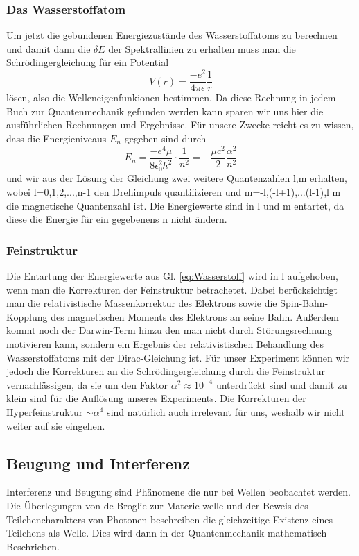 \documentclass[]{article}
\begin{document}
\subsubsection{Das Wasserstoffatom}
Um jetzt die gebundenen Energiezustände des Wasserstoffatoms zu berechnen und damit dann die $\delta E$ der Spektrallinien zu erhalten muss man die Schrödingergleichung für ein Potential
\begin{equation}
	V(r)=\frac{-e^2}{4\pi \epsilon} \frac{1}{r}
\end{equation}
lösen, also die Welleneigenfunkionen bestimmen. Da diese Rechnung in jedem Buch zur Quantenmechanik gefunden werden kann sparen wir uns hier die ausführlichen Rechnungen und Ergebnisse. Für unsere Zwecke reicht es zu wissen, dass die Energieniveaus $E_{n}$ gegeben sind durch
\begin{equation}
\label{eq:Wasserstoff}
	E_{n}=\frac{-e^4\mu}{8\epsilon_0^2h^2}\cdot \frac{1}{n^2}=-\frac{\mu c^2}{2}\frac{\alpha^2}{n^2}
\end{equation} und wir aus der Lösung der Gleichung zwei weitere Quantenzahlen l,m erhalten, wobei l=0,1,2,...,n-1 den Drehimpuls quantifizieren und m=-l,(-l+1),...(l-1),l m die magnetische Quantenzahl ist. Die Energiewerte sind in l und m entartet, da diese die Energie für ein gegebenens n nicht ändern.
\subsubsection{Feinstruktur}
Die Entartung der Energiewerte aus Gl. \ref{eq:Wasserstoff} wird in l aufgehoben, wenn man die Korrekturen der Feinstruktur betrachetet. Dabei berücksichtigt man die relativistische Massenkorrektur des Elektrons sowie die Spin-Bahn-Kopplung des magnetischen Moments des Elektrons an seine Bahn. Außerdem kommt noch der Darwin-Term hinzu den man nicht durch Störungsrechnung motivieren kann, sondern ein Ergebnis der relativistischen Behandlung des Wasserstoffatoms mit der Dirac-Gleichung ist. 
Für unser Experiment können wir jedoch die Korrekturen an die Schrödingergleichung durch die Feinstruktur vernachlässigen, da sie um den Faktor $\alpha^2 \approx  10^{-4}$ unterdrückt sind und damit zu klein sind für die Auflösung unseres Experiments. Die Korrekturen der Hyperfeinstruktur $\sim \alpha^4$ sind natürlich auch irrelevant für uns, weshalb wir nicht weiter auf sie eingehen.
\subsection{Beugung und Interferenz} %
Interferenz und Beugung sind Phänomene die nur bei Wellen beobachtet werden. Die Überlegungen von de Broglie zur Materie-welle und der Beweis des Teilchencharakters von Photonen beschreiben die gleichzeitige Existenz eines Teilchens als Welle. Dies wird dann in der Quantenmechanik mathematisch Beschrieben. 
\end{document}
